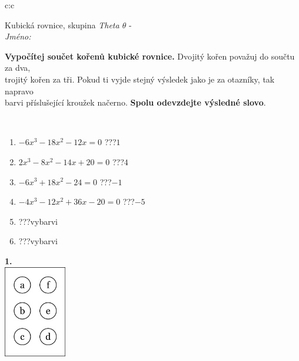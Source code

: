 \documentclass[10pt]{report}
\begin{document}
\begin{tabular}{c:c}
\begin{minipage}[c][104.5mm][t]{0.5\linewidth}
\begin{center}
\vspace{7mm}
{\huge Kubická rovnice, skupina \textit{Theta $\theta$} -}\\[5mm]
\textit{Jméno:}\phantom{xxxxxxxxxxxxxxxxxxxxxxxxxxxxxxxxxxxxxxxxxxxxxxxxxxxxxxxxxxxxxxxxx}\\[5mm]
\begin{minipage}{0.95\linewidth}
\begin{center}
\textbf{Vypočítej součet kořenů kubické rovnice.} Dvojitý kořen považuj do součtu za dva,\\trojitý kořen za tři. Pokud ti vyjde stejný výsledek jako je za otazníky, tak napravo\\barvi příslušející kroužek načerno. \textbf{Spolu odevzdejte výsledné slovo}.
\end{center}
\end{minipage}
\\[1mm]
\begin{minipage}{0.79\linewidth}
\begin{center}
\begin{varwidth}{\linewidth}
\begin{enumerate}
\Large
\item $-6x^3-18x^2-12x=0$\quad \dotfill\; ???\;\dotfill \quad $1$
\item $2x^3-8x^2-14x+20=0$\quad \dotfill\; ???\;\dotfill \quad $4$
\item $-6x^3+18x^2-24=0$\quad \dotfill\; ???\;\dotfill \quad $-1$
\item $-4x^3-12x^2+36x-20=0$\quad \dotfill\; ???\;\dotfill \quad $-5$
\item \quad \dotfill\; ???\;\dotfill \quad vybarvi
\item \quad \dotfill\; ???\;\dotfill \quad vybarvi
\end{enumerate}
\end{varwidth}
\end{center}
\end{minipage}
\begin{minipage}{0.20\linewidth}
\begin{center}
{\Huge\bfseries 1.} \\[2mm]
\includegraphics[height=40mm]{../images/braille.png}

\end{center}
\end{minipage}
\end{center}
\end{minipage}
\end{tabular}
\end{document}
